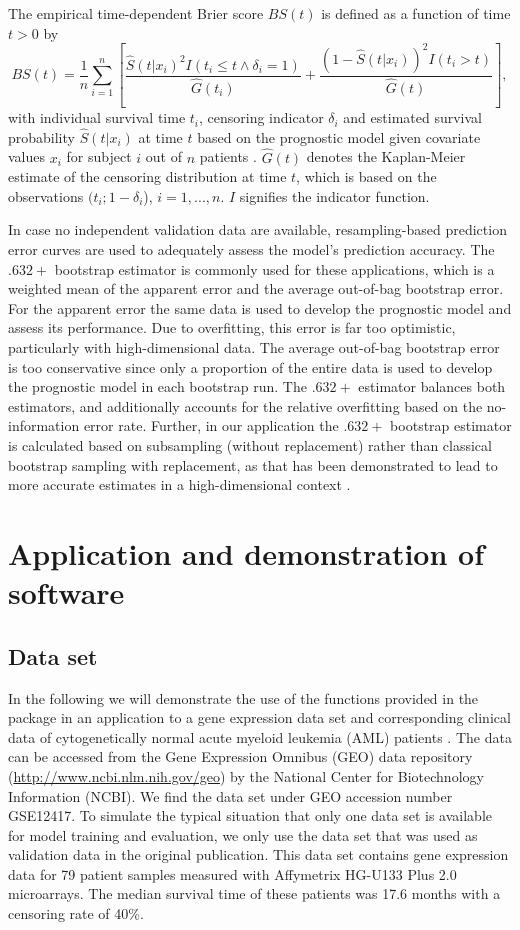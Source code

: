 \documentclass[nojss]{jss}
\begin{document}
The empirical time-dependent Brier score $BS(t)$ is defined as a function of time $t > 0$ by
\[
BS(t) = \frac{1}{n}\sum_{i=1}^{n}{\left[\frac{\hat{S}(t|x_i)^2I(t_i\leq t \wedge \delta_i=1)}{\hat{G}(t_i)} + \frac{(1-\hat{S}(t|x_i))^2I(t_i>t)}{\hat{G}(t)}\right]},
\]
with individual survival time $t_i$, censoring indicator $\delta_i$ and estimated survival probability $\hat{S}(t|x_i)$ at time $t$ based on the prognostic model given covariate values $x_i$ for subject $i$ out of $n$ patients \citep{graf99}.
$\hat G(t)$ denotes the Kaplan-Meier estimate of the censoring distribution at time $t$, which is based on the observations $(t_i; 1-\delta_i$), $i = 1,...,n$. $I$ signifies the indicator function. 

In case no independent validation data are available, resampling-based prediction error curves are used to adequately assess the model's prediction accuracy. The $.632+$ bootstrap estimator \citep{efron1997} is commonly used for these applications, which is a weighted mean of the apparent error and the average out-of-bag bootstrap error. For the apparent error  the same data is used to develop the prognostic model and assess its performance. Due to overfitting, this error is far too optimistic, particularly with high-dimensional data. The average out-of-bag bootstrap error is too conservative since only a proportion of the entire data is used to develop the prognostic model in each bootstrap run. 
The $.632+$ estimator balances both estimators, and additionally accounts for the relative overfitting based on the no-information error rate.
Further, in our application the $.632+$ bootstrap estimator is calculated based on subsampling (without replacement) rather than classical bootstrap sampling with replacement, as that has been demonstrated to lead to more accurate estimates in a high-dimensional context \citep{BS2008}.




\section{Application and demonstration of software}

\subsection{Data set}
\nocite{metzeler08}
In the following we will demonstrate the use of the functions provided in the  package in an application to a gene expression data set and corresponding clinical data of cytogenetically normal acute myeloid leukemia (AML) patients \citep{metzeler08}. The data can be accessed from the Gene Expression Omnibus (GEO) data repository (\url{http://www.ncbi.nlm.nih.gov/geo}) by the National Center for Biotechnology Information (NCBI). We find the data set under GEO accession number GSE12417. To simulate the typical situation that only one data set is available for model training and evaluation, we only use the data set that was used as validation data in the original publication. This data set contains gene expression data for 79 patient samples measured with Affymetrix HG-U133 Plus 2.0 microarrays. The median survival time of these patients was 17.6 months with a censoring rate of 40\%.
\end{document}
